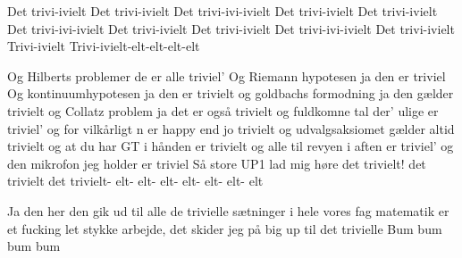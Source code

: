 \documentclass[a4paper,11pt]{article}
\begin{document}
\begin{song}
 Det trivi-ivielt
Det trivi-ivielt
Det trivi-ivi-ivielt
Det trivi-ivielt
Det trivi-ivielt
Det trivi-ivi-ivielt
Det trivi-ivielt
Det trivi-ivielt
Det trivi-ivi-ivielt
Det trivi-ivielt
Trivi-ivielt
Trivi-ivielt-elt-elt-elt-elt

 Og Hilberts problemer de er alle triviel’
Og Riemann hypotesen ja den er triviel
Og kontinuumhypotesen ja den er trivielt
og goldbachs formodning ja den gælder trivielt
og Collatz problem ja det er også trivielt
og fuldkomne tal der’ ulige er triviel’
og for vilkårligt n er happy end jo trivielt
og udvalgsaksiomet gælder altid trivielt
og at du har GT i hånden er trivielt
og alle til revyen i aften er triviel’
og den mikrofon jeg holder er triviel
Så store UP1 lad mig høre det trivielt!
det trivielt
det trivielt- elt- elt- elt- elt- elt- elt- elt

 Ja den her den gik ud til alle de trivielle sætninger i hele vores fag
matematik er et fucking let stykke arbejde, det skider jeg på
big up til det trivielle
Bum bum bum bum 



\end{song}
\end{document}
